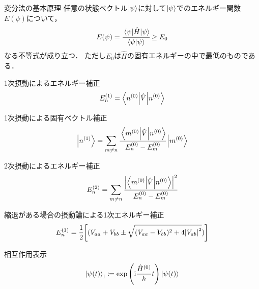 \documentclass{report}
\begin{document}
\begin{itembox}[l]{変分法の基本原理}
  任意の状態ベクトル$\ket{\psi}$に対して$\ket{\psi}$でのエネルギー関数$E(\psi)$について，
  \begin{align}
    E(\psi) = \cfrac{\mel{\psi}{\hat{H}}{\psi}}{\braket{\psi}} \geq E_0 \label{minimum}
  \end{align}
  なる不等式が成り立つ．
  ただし$E_0$は$\hat{H}$の固有エネルギーの中で最低のものである．
\end{itembox}

\begin{itembox}[l]{1次摂動によるエネルギー補正}
  \begin{align}
    E_n^{(1)} = \ev**{\hat{V}}{n^{(0)}}
  \end{align}
\end{itembox}

\begin{itembox}[l]{1次摂動による固有ベクトル補正}
  \begin{align}
    \ket{n^{(1)}} = \sum_{m\neq n}\cfrac{\mel**{m^{(0)}}{\hat{V}}{n^{(0)}}}{E_n^{(0)} - E_m^{(0)}}\ket{m^{(0)}}\label{1st-order-eigenvector}
  \end{align}
\end{itembox}

\begin{itembox}[l]{2次摂動によるエネルギー補正}
  \begin{align}
    E_n^{(2)} = \sum_{m\neq n}\cfrac{\abs{\mel**{m^{(0)}}{\hat{V}}{n^{(0)}}}^2}{E_n^{(0)} - E_m^{(0)}}\label{2nd-order-perturbation-eigenvalue}
  \end{align}
\end{itembox}

\begin{itembox}[l]{縮退がある場合の摂動論による1次エネルギー補正}
  \begin{align}
    E_n^{(1)} = \frac{1}{2}\qty[(V_{aa} + V_{bb}\pm\sqrt{(V_{aa} - V_{bb})^2 + 4\abs{V_{ab}}^2})]\label{1st-order-energy-with-degeneracy}
  \end{align}
\end{itembox}

\begin{itembox}[l]{相互作用表示}
  \begin{align}
    \ket{\psi(t)}_{\mathrm{I}} \coloneqq \exp\qty(\mathrm{i}\frac{\hat{H}^{(0)}}{\hbar}t)\ket{\psi(t)}\label{interaction-picture}
  \end{align}
\end{itembox}
\end{document}
